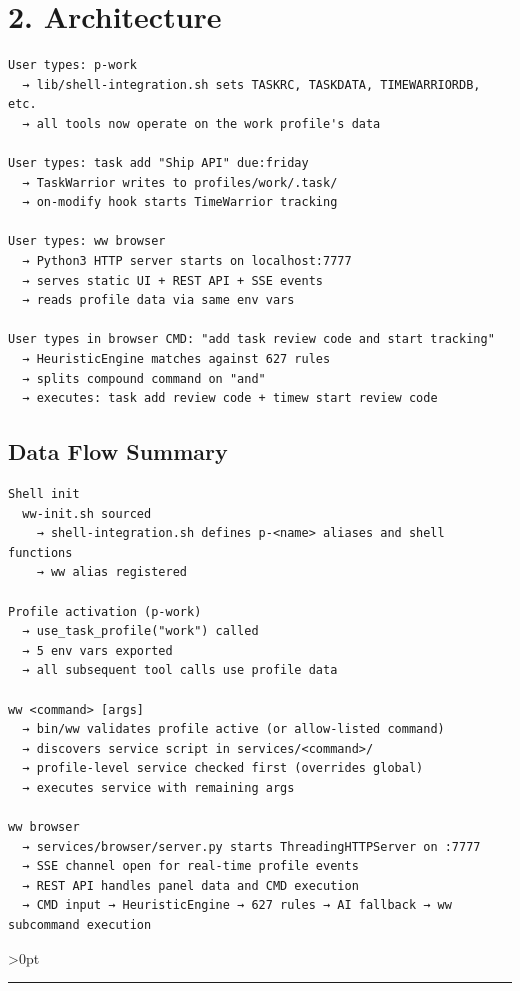 \documentclass[11pt, a4paper, DIV=14]{scrartcl}
\let\origRule\rule
\renewcommand{\rule}[3][0pt]{%
  \ifnum\dimexpr#3\relax>0pt
    \par\vspace{2pt}\noindent{\color{BabbBorder}\origRule[#1]{#2}{#3}}\par\vspace{2pt}%
  \else
    \origRule[#1]{#2}{#3}%
  \fi
}
\begin{document}
\section{2. Architecture}\label{architecture}

\begin{verbatim}
User types: p-work
  → lib/shell-integration.sh sets TASKRC, TASKDATA, TIMEWARRIORDB, etc.
  → all tools now operate on the work profile's data

User types: task add "Ship API" due:friday
  → TaskWarrior writes to profiles/work/.task/
  → on-modify hook starts TimeWarrior tracking

User types: ww browser
  → Python3 HTTP server starts on localhost:7777
  → serves static UI + REST API + SSE events
  → reads profile data via same env vars

User types in browser CMD: "add task review code and start tracking"
  → HeuristicEngine matches against 627 rules
  → splits compound command on "and"
  → executes: task add review code + timew start review code
\end{verbatim}

\subsection{Data Flow Summary}\label{data-flow-summary}

\begin{verbatim}
Shell init
  ww-init.sh sourced
    → shell-integration.sh defines p-<name> aliases and shell functions
    → ww alias registered

Profile activation (p-work)
  → use_task_profile("work") called
  → 5 env vars exported
  → all subsequent tool calls use profile data

ww <command> [args]
  → bin/ww validates profile active (or allow-listed command)
  → discovers service script in services/<command>/
  → profile-level service checked first (overrides global)
  → executes service with remaining args

ww browser
  → services/browser/server.py starts ThreadingHTTPServer on :7777
  → SSE channel open for real-time profile events
  → REST API handles panel data and CMD execution
  → CMD input → HeuristicEngine → 627 rules → AI fallback → ww subcommand execution
\end{verbatim}

\begin{center}\rule{0.5\linewidth}{0.5pt}\end{center}
\end{document}
